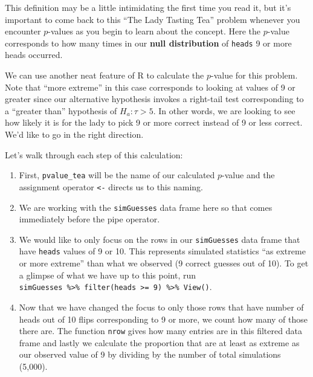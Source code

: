 \documentclass[]{tufte-book}
\newenvironment{Shaded}{\begin{snugshade}}{\end{snugshade}}
\newcommand{\KeywordTok}[1]{\textcolor[rgb]{0.13,0.29,0.53}{\textbf{{#1}}}}
\newcommand{\DecValTok}[1]{\textcolor[rgb]{0.00,0.00,0.81}{{#1}}}
\newcommand{\StringTok}[1]{\textcolor[rgb]{0.31,0.60,0.02}{{#1}}}
\newcommand{\NormalTok}[1]{{#1}}
\begin{document}
This definition may be a little intimidating the first time you read it,
but it's important to come back to this ``The Lady Tasting Tea'' problem
whenever you encounter \(p\)-values as you begin to learn about the
concept. Here the \(p\)-value corresponds to how many times in our
\textbf{null distribution} of \texttt{heads} 9 or more heads occurred.

We can use another neat feature of R to calculate the \(p\)-value for
this problem. Note that ``more extreme'' in this case corresponds to
looking at values of 9 or greater since our alternative hypothesis
invokes a right-tail test corresponding to a ``greater than'' hypothesis
of \(H_a: \tau > 5\). In other words, we are looking to see how likely
it is for the lady to pick 9 or more correct instead of 9 or less
correct. We'd like to go in the right direction.

\begin{Shaded}
\end{Shaded}

Let's walk through each step of this calculation:

\begin{enumerate}
\def\labelenumi{\arabic{enumi}.}
\item
  First, \texttt{pvalue\_tea} will be the name of our calculated
  \(p\)-value and the assignment operator \texttt{\textless{}-} directs
  us to this naming.
\item
  We are working with the \texttt{simGuesses} data frame here so that
  comes immediately before the pipe operator.\\
\item
  We would like to only focus on the rows in our \texttt{simGuesses}
  data frame that have \texttt{heads} values of 9 or 10. This represents
  simulated statistics ``as extreme or more extreme'' than what we
  observed (9 correct guesses out of 10). To get a glimpse of what we
  have up to this point, run
  \texttt{simGuesses\ \%\textgreater{}\%\ filter(heads\ \textgreater{}=\ 9)\ \%\textgreater{}\%\ View()}.
\item
  Now that we have changed the focus to only those rows that have number
  of heads out of 10 flips corresponding to 9 or more, we count how many
  of those there are. The function \texttt{nrow} gives how many entries
  are in this filtered data frame and lastly we calculate the proportion
  that are at least as extreme as our observed value of 9 by dividing by
  the number of total simulations (5,000).
\end{enumerate}
\end{document}
